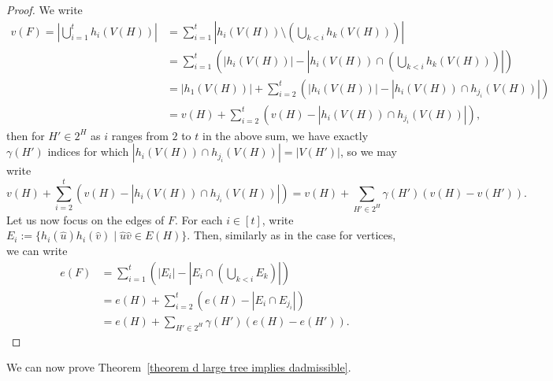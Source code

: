 \documentclass[12pt,letterpaper]{article}
\theoremstyle{definition}
\begin{document}
	\begin{proof}
		We write
		\begin{align*}
			v(F)=\left|\bigcup_{i=1}^t h_i(V(H))\right|&=\sum_{i=1}^t \left|h_i(V(H))\setminus\left(\bigcup_{k<i} h_k(V(H))\right)\right|\\
			&=\sum_{i=1}^t\left( |h_i(V(H))|-\left| h_i(V(H))\cap \left(\bigcup_{k<i} h_k(V(H))\right)\right|\right)\\
			&=|h_1(V(H))|+\sum_{i=2}^t \left(|h_i(V(H))|-\left| h_i(V(H))\cap h_{j_i}(V(H))\right|\right)\\
			&=v(H)+\sum_{i=2}^t\left( v(H)-\left| h_i(V(H))\cap h_{j_i}(V(H))\right|\right),
		\end{align*}
		then for $H'\in 2^H$ as $i$ ranges from $2$ to $t$ in the above sum, we have exactly $\gamma(H')$ indices for which $\left| h_i(V(H))\cap h_{j_i}(V(H))\right|=|V(H')|$, so we may write
		\[
		v(H)+\sum_{i=2}^t \left(v(H)-| h_i(V(H))\cap h_{j_i}(V(H))|\right)=v(H)+\sum_{H'\in 2^H} \gamma(H')(v(H)-v(H')).
		\]
		Let us now focus on the edges of $F$. For each $i\in [t]$, write $E_i:=\{h_i(\hat{u})h_i(\hat{v})\mid \hat{u}\hat{v}\in E(H)\}$. Then, similarly as in the case for vertices, we can write
		\begin{align*}
			e(F)&=\sum_{i=1}^t\left( |E_i|-\left| E_i\cap \left(\bigcup_{k<i} E_k\right)\right|\right)\\
			&=e(H)+\sum_{i=2}^t\left( e(H)-\left|E_i\cap E_{j_i}\right|\right)\\
			&=e(H)+\sum_{H'\in 2^H}\gamma(H')\left(e(H)-e(H')\right).
		\end{align*}
	\end{proof}
	
	We can now prove Theorem~\ref{theorem d large tree implies dadmissible}.
	
\end{document}
